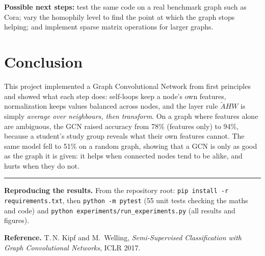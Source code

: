 \documentclass[11pt,a4paper]{article}
\newcommand{\Anorm}{\tilde{A}}
\begin{document}
\textbf{Possible next steps:} test the same code on a real benchmark graph such as Cora; vary the homophily level to find the point at which the graph stops helping; and implement sparse matrix operations for larger graphs.

\section{Conclusion}

This project implemented a Graph Convolutional Network from first principles and showed what each step does: self-loops keep a node's own features, normalization keeps values balanced across nodes, and the layer rule $\Anorm H W$ is simply \emph{average over neighbours, then transform}. On a graph where features alone are ambiguous, the GCN raised accuracy from 78\% (features only) to 94\%, because a student's study group reveals what their own features cannot. The same model fell to 51\% on a random graph, showing that a GCN is only as good as the graph it is given: it helps when connected nodes tend to be alike, and hurts when they do not.

\vspace{6pt}
\hrule
\vspace{4pt}
{\small
\textbf{Reproducing the results.} From the repository root: \texttt{pip install -r requirements.txt}, then \texttt{python -m pytest} (55 unit tests checking the maths and code) and \texttt{python experiments/run\_experiments.py} (all results and figures).

\textbf{Reference.} T.\,N. Kipf and M.~Welling, \emph{Semi-Supervised Classification with Graph Convolutional Networks}, ICLR 2017.
}
\end{document}
